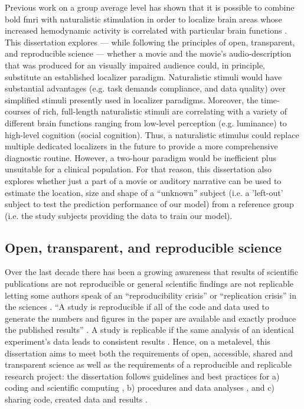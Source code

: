 %
Previous work on a group average level has shown that it is possible to combine
\ac{bold} \ac{fmri} with naturalistic stimulation in order to localize brain
areas whose increased hemodynamic activity is correlated with particular brain
functions \citep{bartels2004mapping}.
%
This dissertation explores --- while following the principles of open,
transparent, and reproducible science --- whether a movie and the movie's
audio-description that was produced for an visually impaired audience could, in
principle, substitute an established localizer paradigm.
%
Naturalistic stimuli would have substantial advantages (e.g. task demands
compliance, and data quality) over simplified stimuli presently used in
localizer paradigms.
%
Moreover, the time-courses of rich, full-length naturalistic stimuli are
correlating with a variety of different brain functions ranging from low-level
perception (e.g.  luminance) to high-level cognition (social cognition).
%
Thus, a naturalistic stimulus could replace multiple dedicated localizers in the
future to provide a more comprehensive diagnostic routine.
%
However, a two-hour paradigm would be inefficient plus unsuitable for a clinical
population.
%
For that reason, this dissertation also explores whether just a part of a movie
or auditory narrative can be used to estimate the location, size and shape of a
``unknown'' subject (i.e. a 'left-out' subject to test the prediction
performance of our model) from a reference group (i.e. the study subjects
providing the data to train our model).


\subsection{Open, transparent, and reproducible science}

Over the last decade there has been a growing awareness that results of
scientific publications are not reproducible or general scientific findings are
not replicable letting some authors speak of an ``reproducibility crisis'' or
``replication crisis'' in the sciences \citep{baker2016reproducibility,
plesser2018reproducibility, stupple2019reproducibility, nosek2022replicability}.
``A study is reproducible if all of the code and data used to generate the
numbers and figures in the paper are available and exactly produce the published
results'' \citep{leek2017most}.
A study is replicable if the same analysis of an identical experiment's data
leads to consistent results \citep{dubois2016building, leek2017most}.
%
Hence, on a metalevel, this dissertation aims to meet both the requirements of
open, accessible, shared and transparent science \citep{watson2015will,
fecher2014open} as well as the requirements of a reproducible and replicable
research project:
%
the dissertation follows guidelines and best practices for a) coding and
scientific computing \citep{wilson2014best}, b) procedures and data analyses
\citep{nichols2017best, poldrack2017scanning, poldrack2019establishment}, and c)
sharing code, created data and results \citep{eglen2017toward, nichols2017best,
pernet2015improving}.


